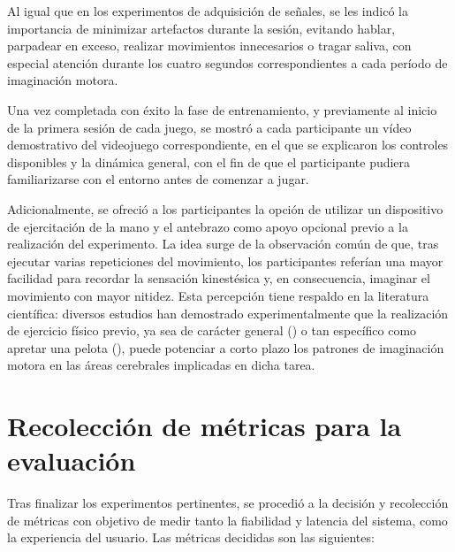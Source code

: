 Al igual que en los experimentos de adquisición de señales, se les indicó la
importancia de minimizar artefactos durante la sesión, evitando hablar,
parpadear en exceso, realizar movimientos innecesarios o tragar saliva, con
especial atención durante los cuatro segundos correspondientes a cada período
de imaginación motora.

Una vez completada con éxito la fase de entrenamiento, y previamente al inicio
de la primera sesión de cada juego, se mostró a cada participante un vídeo
demostrativo del videojuego correspondiente, en el que se explicaron los
controles disponibles y la dinámica general, con el fin de que el participante
pudiera familiarizarse con el entorno antes de comenzar a jugar.

Adicionalmente, se ofreció a los participantes la opción de utilizar un
dispositivo de ejercitación de la mano y el antebrazo como apoyo opcional
previo a la realización del experimento. La idea surge de la observación común
de que, tras ejecutar varias repeticiones del movimiento, los participantes
referían una mayor facilidad para recordar la sensación kinestésica y, en
consecuencia, imaginar el movimiento con mayor nitidez. Esta percepción tiene
respaldo en la literatura científica: diversos estudios han demostrado
experimentalmente que la realización de ejercicio físico previo, ya sea de
carácter general (\cite{wriessnegger2018frequency}) o tan específico como apretar
una pelota (\cite{park2021improving}), puede potenciar a corto plazo los
patrones de imaginación motora en las áreas cerebrales implicadas en dicha
tarea.

\section{Recolección de métricas para la evaluación}
\label{sec:rt_metricas}

Tras finalizar los experimentos pertinentes, se procedió a la decisión y
recolección de métricas con objetivo de medir tanto la fiabilidad y latencia
del sistema, como la experiencia del usuario. Las métricas decididas son las
siguientes:

